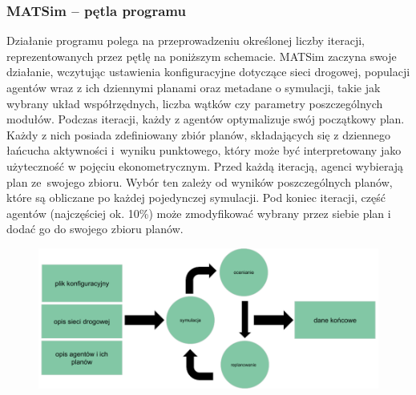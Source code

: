 \subsubsection{MATSim -- pętla programu}
Działanie programu polega na przeprowadzeniu określonej liczby iteracji, reprezentowanych przez pętlę na poniższym schemacie. MATSim zaczyna swoje działanie, wczytując ustawienia konfiguracyjne dotyczące sieci drogowej, populacji agentów wraz z ich dziennymi planami oraz metadane o symulacji, takie jak wybrany układ współrzędnych, liczba wątków czy parametry poszczególnych modułów. Podczas iteracji, każdy z agentów optymalizuje swój początkowy plan. Każdy z nich posiada zdefiniowany zbiór planów, składających się z dziennego łańcucha aktywności i~wyniku punktowego, który może być interpretowany jako użyteczność w pojęciu ekonometrycznym. Przed każdą iteracją, agenci wybierają plan ze~swojego zbioru. Wybór ten zależy od wyników poszczególnych planów, które są obliczane po każdej pojedynczej symulacji. Pod koniec iteracji, część agentów (najczęściej ok. 10\%) może zmodyfikować wybrany przez siebie plan i dodać go do swojego zbioru planów. 
    \begin{figure}[h]
        \includegraphics[width=\textwidth]{images/mopsim/matsim-workflow.png}
    \end{figure}
\newpage
